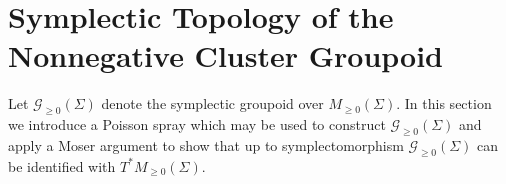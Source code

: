 \documentclass{amsart}
\newcommand{\cG}{\mathcal{G}}
\begin{document}
\section{Symplectic Topology of the Nonnegative Cluster Groupoid}
Let $\cG_{\ge0}(\Sigma)$ denote the symplectic groupoid over $M_{\ge0}(\Sigma)$.  
In this section we introduce a Poisson spray which may be used to construct $\cG_{\ge0}(\Sigma)$ and apply a Moser argument to show that up to symplectomorphism $\cG_{\ge0}(\Sigma)$ can be identified with $T^*M_{\ge0}(\Sigma)$.



\end{document}
